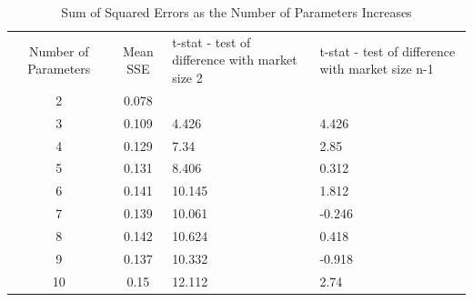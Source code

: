 \documentclass[11pt]{article}
\begin{document}
\begin{longtable}{|ccC{3cm}C{3cm}|}
\caption{\label{tab:org72896a6}
Sum of Squared Errors as the Number of Parameters Increases}
\\
\hline
Number of Parameters & Mean SSE & t-stat - test of difference with market size 2 & t-stat - test of difference with market size n-1\\
2 & 0.078 &  & \\
3 & 0.109 & 4.426 & 4.426\\
4 & 0.129 & 7.34 & 2.85\\
5 & 0.131 & 8.406 & 0.312\\
6 & 0.141 & 10.145 & 1.812\\
7 & 0.139 & 10.061 & -0.246\\
8 & 0.142 & 10.624 & 0.418\\
9 & 0.137 & 10.332 & -0.918\\
10 & 0.15 & 12.112 & 2.74\\
\hline
\end{longtable}
\end{document}

